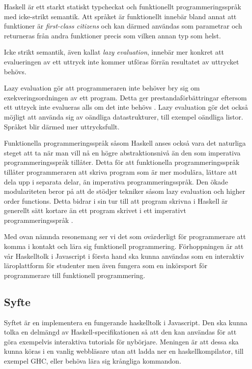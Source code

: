 Haskell är ett starkt statiskt typcheckat och funktionellt programmeringsspråk med icke-strikt semantik. %
Att språket är funktionellt innebär bland annat att funktioner är \emph{first-class citizens} och kan därmed användas som parametrar och returneras från andra funktioner precis som vilken annan typ som helst.

Icke strikt semantik, även kallat \emph{lazy evaluation}, innebär mer konkret att evalueringen av ett uttryck inte kommer utföras förrän resultatet av uttrycket behövs. %

Lazy evaluation gör att programmeraren inte behöver bry sig om exekveringsordningen av ett program. Detta ger prestandaförbättringar eftersom ett uttryck inte evalueras alls om det inte behövs \citep{hudak89}.
Lazy evaluation gör det också möjligt att använda sig av oändliga datastrukturer, till exempel oändliga listor. Språket blir därmed mer uttrycksfullt. 

Funktionella programmeringsspråk såsom Haskell anses också vara det naturliga steget att ta när man vill nå en högre abstraktionsnivå än den som imperativa programmeringsspråk tillåter. %
Detta för att funktionella programmeringsspråk tillåter programmeraren att skriva program som är mer modulära, lättare att dela upp i separata delar, än imperativa programmeringsspråk. Den ökade modulariteten beror på att de stödjer tekniker såsom lazy evaluation och higher order functions.
Detta bidrar i sin tur till att program skrivna i Haskell är generellt sätt kortare än ett program skrivet i ett imperativt programmeringsspråk  \citep{why}.

Med ovan nämnda resonemang ser vi det som ovärderligt för programmerare att komma i kontakt och lära sig funktionell programmering. 
Förhoppningen är att vår Haskelltolk i Javascript i första hand ska kunna användas som en interaktiv läroplattform för studenter men även fungera som en inkörsport för programmerare till funktionell programmering. 


\subsection{Syfte}
Syftet är en implementera en fungerande haskelltolk i Javascript. Den ska kunna tolka en delmängd av Haskell-specifikationen så att den kan användas för att göra exempelvis interaktiva tutorials för nybörjare.
Meningen är att dessa ska kunna köras i en vanlig webbläsare utan att ladda ner en haskellkompilator, till exempel GHC, eller behöva lära sig krångliga kommandon.

